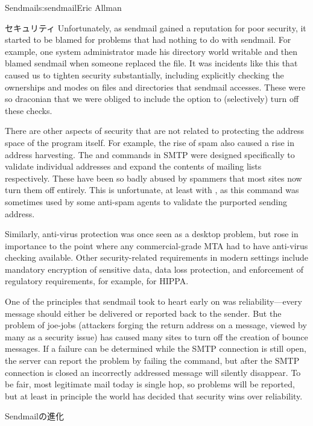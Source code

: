 \begin{aosachapter}{Sendmail}{s:sendmail}{Eric Allman}
\begin{aosasect1}{セキュリティ}
Unfortunately, as sendmail gained a reputation for poor security, it
started to be blamed for problems that had nothing to do with
sendmail.  For example, one system administrator made his 
directory world writable and then blamed sendmail when someone
replaced the  file. It was incidents like this that
caused us to tighten security substantially, including explicitly
checking the ownerships and modes on files and directories that
sendmail accesses. These were so draconian that we were obliged to
include the  option to (selectively) turn off
these checks.

There are other aspects of security that are not related to protecting
the address space of the program itself. For example, the rise of spam
also caused a rise in address harvesting. The  and  commands
in SMTP were designed specifically to validate individual addresses
and expand the contents of mailing lists respectively. These have been
so badly abused by spammers that most sites now turn them off
entirely. This is unfortunate, at least with , as this command was
sometimes used by some anti-spam agents to validate the purported
sending address.

Similarly, anti-virus protection was once seen as a desktop problem,
but rose in importance to the point where any commercial-grade MTA had
to have anti-virus checking available.
Other security-related requirements in modern settings
include mandatory encryption of sensitive data,
data loss protection,
and enforcement of regulatory requirements,
for example, for HIPPA.

One of the principles that sendmail took to heart early on was
reliability---every message should either be delivered or reported
back to the sender. But the problem of joe-jobs (attackers forging
the return address on a message, viewed by many as a security issue)
has caused many sites to turn off the
creation of bounce messages. If a failure can be determined while
the SMTP connection is still open, the server can report the problem
by failing the command, but after the SMTP connection is closed an
incorrectly addressed message will silently disappear. To be fair,
most legitimate mail today is single hop, so problems will be
reported, but at least in principle the world has decided that
security wins over reliability.

\end{aosasect1}

\begin{aosasect1}{Sendmailの進化}
\label{sec.sendmail.evo}


\end{aosasect1}
\end{aosachapter}
